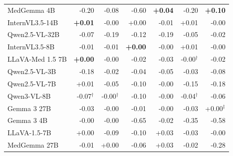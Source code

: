 \begin{table}[h]
\begin{tabular}{lrrrrrr}
MedGemma 4B & \cellcolor{cfTerra3}-0.20 & \cellcolor{cfTerra2}-0.08 & \cellcolor{cfTerra4}-0.60 & \cellcolor{cfSlate2}\textbf{+0.04} & \cellcolor{cfTerra3}-0.20 & \cellcolor{cfSlate3}\textbf{+0.10} \\
InternVL3.5-14B & \cellcolor{cfSlate1}\textbf{+0.01} & \cellcolor{cfTerra1}-0.00 & \cellcolor{cfSlate1}+0.00 & \cellcolor{cfTerra1}-0.01 & \cellcolor{cfSlate1}+0.01 & \cellcolor{cfTerra1}-0.00 \\
Qwen2.5-VL-32B & \cellcolor{cfTerra2}-0.07 & \cellcolor{cfTerra3}-0.19 & \cellcolor{cfTerra3}-0.12 & \cellcolor{cfTerra3}-0.19 & \cellcolor{cfTerra2}-0.05 & \cellcolor{cfTerra2}-0.02 \\
InternVL3.5-8B & \cellcolor{cfTerra1}-0.01 & \cellcolor{cfTerra1}-0.01 & \cellcolor{cfSlate1}\textbf{+0.00} & \cellcolor{cfTerra1}-0.00 & \cellcolor{cfSlate1}+0.01 & \cellcolor{cfTerra1}-0.00 \\
LLaVA-Med 1.5 7B & \cellcolor{cfSlate1}\textbf{+0.00} & \cellcolor{cfTerra1}-0.00 & \cellcolor{cfTerra2}-0.02 & \cellcolor{cfTerra2}-0.03 & \cellcolor{cfTerra1}-0.00$^{\dagger}$ & \cellcolor{cfTerra1}-0.02 \\
Qwen2.5-VL-3B & \cellcolor{cfTerra3}-0.18 & \cellcolor{cfTerra1}-0.02 & \cellcolor{cfTerra2}-0.04 & \cellcolor{cfTerra2}-0.05 & \cellcolor{cfTerra2}-0.03 & \cellcolor{cfTerra2}-0.08 \\
Qwen2.5-VL-7B & \cellcolor{cfSlate1}+0.01 & \cellcolor{cfTerra2}-0.05 & \cellcolor{cfTerra2}-0.10 & \cellcolor{cfTerra1}-0.00 & \cellcolor{cfTerra3}-0.15 & \cellcolor{cfTerra3}-0.18 \\
Qwen3-VL-8B & \cellcolor{cfTerra2}-0.07$^{\dagger}$ & \cellcolor{cfTerra1}-0.00$^{\dagger}$ & \cellcolor{cfTerra2}-0.10 & \cellcolor{cfTerra1}-0.00 & \cellcolor{cfTerra2}-0.04$^{\dagger}$ & \cellcolor{cfTerra2}-0.06 \\
Gemma 3 27B & \cellcolor{cfTerra2}-0.03 & \cellcolor{cfTerra1}-0.00 & \cellcolor{cfTerra1}-0.01 & \cellcolor{cfTerra1}-0.00 & \cellcolor{cfTerra2}-0.03 & \cellcolor{cfSlate1}+0.00$^{\ddagger}$ \\
Gemma 3 4B & \cellcolor{cfTerra1}-0.00 & \cellcolor{cfTerra1}-0.00 & \cellcolor{cfTerra4}-0.65 & \cellcolor{cfTerra1}-0.02 & \cellcolor{cfTerra4}-0.35 & \cellcolor{cfTerra4}-0.58 \\
LLaVA-1.5-7B & \cellcolor{cfSlate1}+0.00 & \cellcolor{cfTerra2}-0.09 & \cellcolor{cfTerra2}-0.10 & \cellcolor{cfSlate2}+0.03 & \cellcolor{cfTerra2}-0.03 & \cellcolor{cfTerra1}-0.00 \\
MedGemma 27B & \cellcolor{cfTerra1}-0.01 & \cellcolor{cfSlate1}+0.00 & \cellcolor{cfTerra2}-0.06 & \cellcolor{cfSlate2}+0.03 & \cellcolor{cfTerra1}-0.02 & \cellcolor{cfTerra4}-0.28 \\

\end{tabular}
\end{table}
